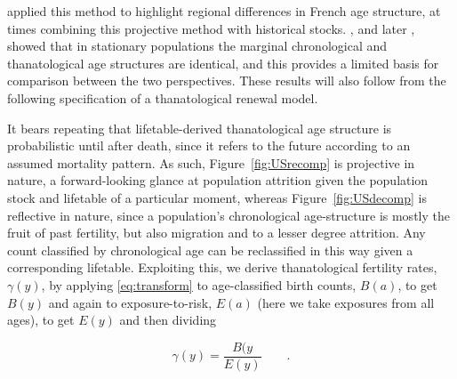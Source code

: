\documentclass{article}
\newcommand{\ep}{\quad\quad\text{.}}
\begin{document}
\citet{brouard1986structure} applied this method to highlight regional
differences in French age structure, at times combining this projective method
with historical stocks. \citet{brouard1989mouvements}, and later
\citet{vaupel2009life}, showed that in stationary populations the
marginal chronological and thanatological age structures are identical, and this
provides a limited basis for comparison between the two perspectives. 
These results will also follow from the following specification of a
thanatological renewal model.

It bears repeating that lifetable-derived thanatological age structure is probabilistic until after death, since it refers to the future according to an assumed mortality pattern.
As such, Figure~\ref{fig:USrecomp} is projective in nature, a forward-looking
glance at population attrition given the population stock and lifetable of a
particular moment, whereas Figure~\ref{fig:USdecomp} is reflective in nature,
since a population's chronological age-structure is mostly the fruit of past
fertility, but also migration and to a lesser degree attrition. Any count
classified by chronological age can be reclassified in this way given a
corresponding lifetable. Exploiting this, we derive thanatological fertility
rates, $\gamma(y)$, by applying \eqref{eq:transform} to age-classified birth
counts, $B(a)$, to get $B(y)$ and again to exposure-to-risk, $E(a)$ (here we
take exposures from all ages), to get $E(y)$ and then dividing

\begin{equation}
\gamma(y) = \frac{B(y}{E(y)} \ep
\end{equation}
\end{document}
